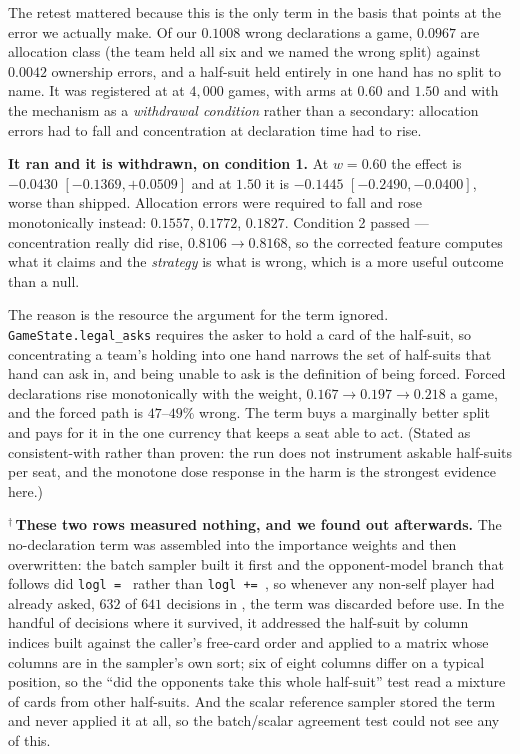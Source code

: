 \documentclass[11pt,letterpaper]{article}
\begin{document}
The retest mattered because this is the only term in the basis that points at
the error we actually make. Of our $0.1008$ wrong declarations a game, $0.0967$
are allocation class (the team held all six and we named the wrong split)
against $0.0042$ ownership errors, and a half-suit held entirely in one
hand has no split to name. It was registered at
 at $4{,}000$ games, with arms at $0.60$ and
$1.50$ and with the mechanism as a \emph{withdrawal condition} rather than a
secondary: allocation errors had to fall and concentration at declaration time
had to rise.

\textbf{It ran and it is withdrawn, on condition 1.} At $w = 0.60$ the effect is
$-0.0430$ $[-0.1369, +0.0509]$ and at $1.50$ it is $-0.1445$ $[-0.2490,
-0.0400]$, worse than shipped. Allocation errors were required to fall and rose
monotonically instead: $0.1557$, $0.1772$, $0.1827$. Condition 2 passed ---
concentration really did rise, $0.8106 \to 0.8168$, so the corrected feature
computes what it claims and the \emph{strategy} is what is wrong, which is a
more useful outcome than a null.

The reason is the resource the argument for the term ignored.
\texttt{GameState.legal\_asks} requires the asker to hold a card of the
half-suit, so concentrating a team's holding into one hand narrows the set of
half-suits that hand can ask in, and being unable to ask is the definition of
being forced. Forced declarations rise monotonically with the weight, $0.167 \to
0.197 \to 0.218$ a game, and the forced path is $47$--$49\%$ wrong. The term
buys a marginally better split and pays for it in the one currency that keeps a
seat able to act. (Stated as consistent-with rather than proven: the run does
not instrument askable half-suits per seat, and the monotone dose response in
the harm is the strongest evidence here.)

$^\dagger$\,\textbf{These two rows measured nothing, and we found out
afterwards.} The no-declaration term was assembled into the importance weights
and then overwritten: the batch sampler built it first and the opponent-model
branch that follows did \texttt{logl = } rather than \texttt{logl += }, so
whenever any non-self player had already asked, $632$ of $641$ decisions in
, the term was discarded before use. In the
handful of decisions where it survived, it addressed the half-suit by column
indices built against the caller's free-card order and applied to a matrix whose
columns are in the sampler's own sort; six of eight columns differ on a typical
position, so the ``did the opponents take this whole half-suit'' test read a
mixture of cards from other half-suits. And the scalar reference sampler stored
the term and never applied it at all, so the batch/scalar agreement test could
not see any of this.
\end{document}
